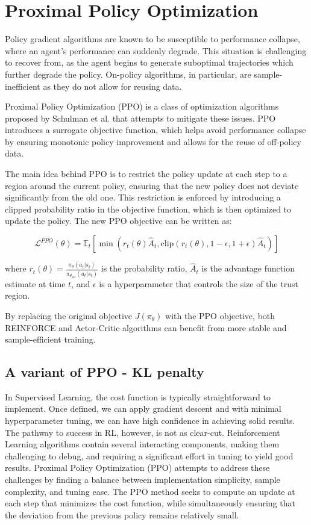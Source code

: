 \section{Proximal Policy Optimization}

Policy gradient algorithms are known to be susceptible to performance collapse, where an agent's performance can suddenly degrade. This situation is challenging to recover from, as the agent begins to generate suboptimal trajectories which further degrade the policy. On-policy algorithms, in particular, are sample-inefficient as they do not allow for reusing data.

Proximal Policy Optimization (PPO) is a class of optimization algorithms proposed by Schulman et al. that attempts to mitigate these issues. PPO introduces a surrogate objective function, which helps avoid performance collapse by ensuring monotonic policy improvement and allows for the reuse of off-policy data.

The main idea behind PPO is to restrict the policy update at each step to a region around the current policy, ensuring that the new policy does not deviate significantly from the old one. This restriction is enforced by introducing a clipped probability ratio in the objective function, which is then optimized to update the policy. The new PPO objective can be written as:

\[
\mathcal{L}^{PPO}(\theta) = \mathbb{E}_{t} \left[ \min \left( r_t(\theta) \hat{A}_t, \text{clip} \left( r_t(\theta), 1 - \epsilon, 1 + \epsilon \right) \hat{A}_t \right) \right]
\]

where $r_t(\theta) = \frac{\pi_{\theta}(a_t|s_t)}{\pi_{\theta_{\text{old}}}(a_t|s_t)}$ is the probability ratio, $\hat{A}_t$ is the advantage function estimate at time $t$, and $\epsilon$ is a hyperparameter that controls the size of the trust region.

By replacing the original objective $J(\pi_{\theta})$ with the PPO objective, both REINFORCE and Actor-Critic algorithms can benefit from more stable and sample-efficient training.

\subsection{A variant of PPO - KL penalty }
In Supervised Learning, the cost function is typically straightforward to implement. Once defined, we can apply gradient descent and with minimal hyperparameter tuning, we can have high confidence in achieving solid results. The pathway to success in RL, however, is not as clear-cut. Reinforcement Learning algorithms contain several interacting components, making them challenging to debug, and requiring a significant effort in tuning to yield good results. Proximal Policy Optimization (PPO) attempts to address these challenges by finding a balance between implementation simplicity, sample complexity, and tuning ease. The PPO method seeks to compute an update at each step that minimizes the cost function, while simultaneously ensuring that the deviation from the previous policy remains relatively small.

